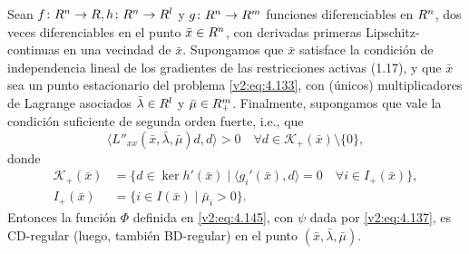 \begin{proposition}\label{v2:prop:4.5.2}
    Sean $f \colon R^n \to R, h \colon R^n \to R^l$ y $g \colon R^n \to R^m$ funciones diferenciables en $R^n$, dos veces diferenciables en el punto $\bar{x} \in R^n$, con derivadas primeras Lipschitz-continuas en una vecindad de $\bar{x}$. Supongamos que $\bar{x}$ satisface la condición de independencia lineal de los gradientes de las restricciones activas (1.17), y que $\bar{x}$ sea un punto estacionario del problema \eqref{v2:eq:4.133}, con (únicos) multiplicadores de Lagrange asociados $\bar{\lambda} \in R^l$ y $\bar{\mu} \in R^m_+$. Finalmente, supongamos que vale la condición suficiente de segunda orden fuerte, i.e., que
    \begin{equation}
        \langle L''_{xx}(\bar{x}, \bar{\lambda}, \bar{\mu})d, d \rangle > 0 \quad \forall d \in \mathcal{K}_+(\bar{x}) \setminus \{0\},
        \label{v2:eq:4.146}
    \end{equation}
    donde
    \begin{align*}
        \mathcal{K}_+(\bar{x}) &= \{d \in \ker h'(\bar{x}) \mid \langle g_i'(\bar{x}), d \rangle = 0 \quad \forall i \in I_+(\bar{x})\}, \\
        I_+(\bar{x}) &= \{i \in I(\bar{x}) \mid \bar{\mu}_i > 0\}.
    \end{align*}
    Entonces la función $\Phi$ definida en \eqref{v2:eq:4.145}, con $\psi$ dada por \eqref{v2:eq:4.137}, es CD-regular (luego, también BD-regular) en el punto $(\bar{x}, \bar{\lambda}, \bar{\mu})$.
\end{proposition}
